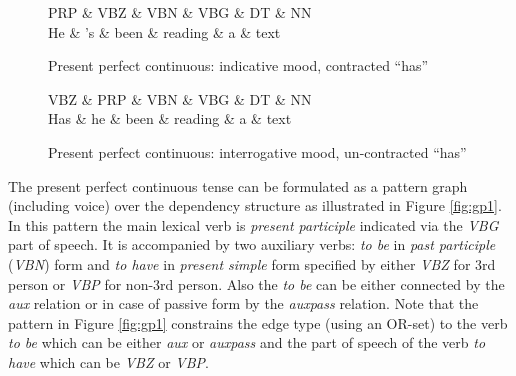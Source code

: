 	\begin{figure}[!ht]
        \centering
		\begin{dependency}
			\begin{deptext}[]
				PRP \& VBZ \& VBN \& VBG \& DT \& NN \\
				He \& 's \& been \& reading \& a \& text \\
			\end{deptext}
		\end{dependency}
		\caption{Present perfect continuous: indicative mood, contracted ``has'' }
		\label{fig:ppc2}
	\end{figure}
    \begin{figure}[!ht]
	\centering
	\begin{dependency}
		\begin{deptext}[]
			VBZ \& PRP \& VBN \& VBG \& DT \& NN \\
			Has \& he \& been \& reading \& a \& text \\
		\end{deptext}
	\end{dependency}
	\caption{Present perfect continuous: interrogative mood, un-contracted ``has''}
	\label{fig:ppc3}
    \end{figure}


    The present perfect continuous tense can be formulated as a pattern graph (including voice) over the dependency structure as illustrated in Figure \ref{fig:gp1}. In this pattern the main lexical verb is \textit{present participle} indicated via the \textit{VBG} part of speech. It is accompanied by two auxiliary verbs: \textit{to be} in \textit{past participle} (\textit{VBN}) form and \textit{to have} in \textit{present simple} form specified by either \textit{VBZ} for 3rd person or \textit{VBP} for non-3rd person. Also the \textit{to be} can be either connected by the \textit{aux} relation or in case of passive form by the \textit{auxpass} relation. Note that the pattern in Figure \ref{fig:gp1} constrains the edge type (using an OR-set) to the verb \textit{to be} which can be either \textit{aux} or \textit{auxpass} and the part of speech of the verb \textit{to have} which can be \textit{VBZ} or \textit{VBP}.

